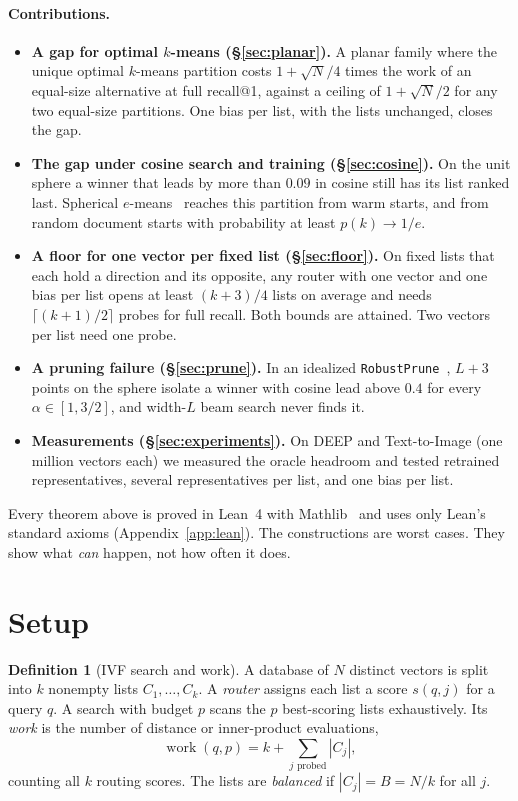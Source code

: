 \documentclass[11pt]{article}
\theoremstyle{definition}
\newtheorem{definition}{Definition}
\theoremstyle{remark}
\newcommand{\work}{\operatorname{work}}
\begin{document}
\paragraph{Contributions.}
\begin{itemize}
\item \textbf{A gap for optimal $k$-means (\S\ref{sec:planar}).} A planar family where the unique optimal $k$-means partition costs $1+\sqrt N/4$ times the work of an equal-size alternative at full recall@1, against a ceiling of $1+\sqrt N/2$ for any two equal-size partitions. One bias per list, with the lists unchanged, closes the gap.
\item \textbf{The gap under cosine search and training (\S\ref{sec:cosine}).} On the unit sphere a winner that leads by more than $0.09$ in cosine still has its list ranked last. Spherical $e$-means~\cite{bessa2026emeans} reaches this partition from warm starts, and from random document starts with probability at least $p(k)\to 1/e$.
\item \textbf{A floor for one vector per fixed list (\S\ref{sec:floor}).} On fixed lists that each hold a direction and its opposite, any router with one vector and one bias per list opens at least $(k+3)/4$ lists on average and needs $\lceil (k+1)/2\rceil$ probes for full recall. Both bounds are attained. Two vectors per list need one probe.
\item \textbf{A pruning failure (\S\ref{sec:prune}).} In an idealized \texttt{RobustPrune}~\cite{subramanya2019diskann}, $L+3$ points on the sphere isolate a winner with cosine lead above $0.4$ for every $\alpha\in[1,3/2]$, and width-$L$ beam search never finds it.
\item \textbf{Measurements (\S\ref{sec:experiments}).} On DEEP and Text-to-Image (one million vectors each) we measured the oracle headroom and tested retrained representatives, several representatives per list, and one bias per list.
\end{itemize}

Every theorem above is proved in Lean~4 with Mathlib~\cite{demoura2021lean4,mathlib2020} and uses only Lean's standard axioms (Appendix~\ref{app:lean}). The constructions are worst cases. They show what \emph{can} happen, not how often it does.

\section{Setup}\label{sec:setup}

\begin{definition}[IVF search and work]
A database of $N$ distinct vectors is split into $k$ nonempty lists $C_1,\dots,C_k$. A \emph{router} assigns each list a score $s(q,j)$ for a query $q$. A search with budget $p$ scans the $p$ best-scoring lists exhaustively. Its \emph{work} is the number of distance or inner-product evaluations,
\[
\work(q,p) = k + \sum_{j \text{ probed}} |C_j|,
\]
counting all $k$ routing scores. The lists are \emph{balanced} if $|C_j|=B=N/k$ for all $j$.
\end{definition}
\end{document}
